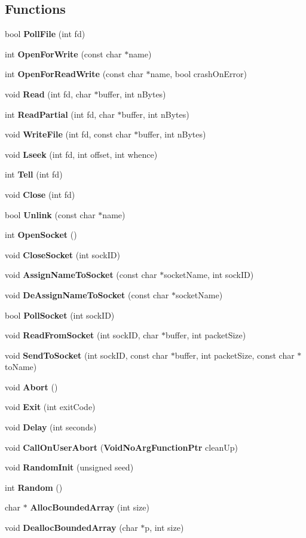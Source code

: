 \subsection*{Functions}
\begin{DoxyCompactItemize}
\item 
bool {\bf Poll\+File} (int fd)
\item 
int {\bf Open\+For\+Write} (const char $\ast$name)
\item 
int {\bf Open\+For\+Read\+Write} (const char $\ast$name, bool crash\+On\+Error)
\item 
void {\bf Read} (int fd, char $\ast$buffer, int n\+Bytes)
\item 
int {\bf Read\+Partial} (int fd, char $\ast$buffer, int n\+Bytes)
\item 
void {\bf Write\+File} (int fd, const char $\ast$buffer, int n\+Bytes)
\item 
void {\bf Lseek} (int fd, int offset, int whence)
\item 
int {\bf Tell} (int fd)
\item 
void {\bf Close} (int fd)
\item 
bool {\bf Unlink} (const char $\ast$name)
\item 
int {\bf Open\+Socket} ()
\item 
void {\bf Close\+Socket} (int sock\+ID)
\item 
void {\bf Assign\+Name\+To\+Socket} (const char $\ast$socket\+Name, int sock\+ID)
\item 
void {\bf De\+Assign\+Name\+To\+Socket} (const char $\ast$socket\+Name)
\item 
bool {\bf Poll\+Socket} (int sock\+ID)
\item 
void {\bf Read\+From\+Socket} (int sock\+ID, char $\ast$buffer, int packet\+Size)
\item 
void {\bf Send\+To\+Socket} (int sock\+ID, const char $\ast$buffer, int packet\+Size, const char $\ast$to\+Name)
\item 
void {\bf Abort} ()
\item 
void {\bf Exit} (int exit\+Code)
\item 
void {\bf Delay} (int seconds)
\item 
void {\bf Call\+On\+User\+Abort} ({\bf Void\+No\+Arg\+Function\+Ptr} clean\+Up)
\item 
void {\bf Random\+Init} (unsigned seed)
\item 
int {\bf Random} ()
\item 
char $\ast$ {\bf Alloc\+Bounded\+Array} (int size)
\item 
void {\bf Dealloc\+Bounded\+Array} (char $\ast$p, int size)
\end{DoxyCompactItemize}


